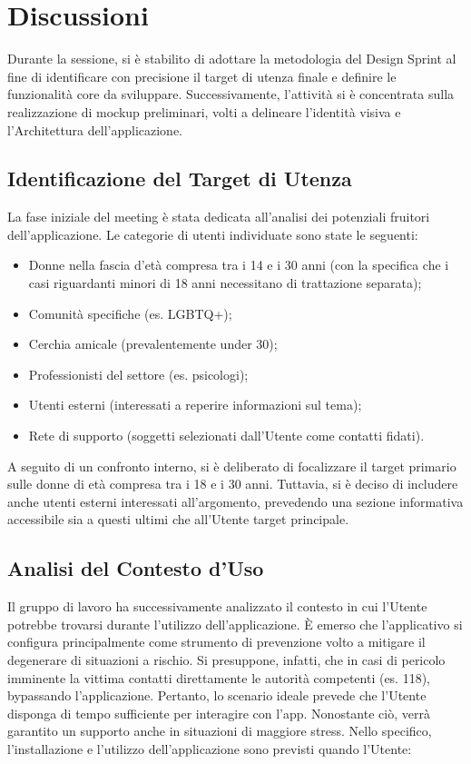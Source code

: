 \documentclass[a4paper,12pt]{article}
\begin{document}
\section{Discussioni}
Durante la sessione, si è stabilito di adottare la metodologia del Design Sprint al fine di identificare con precisione il target di utenza finale e definire le funzionalità core da sviluppare. Successivamente, l'attività si è concentrata sulla realizzazione di mockup preliminari, volti a delineare l'identità visiva e l'Architettura dell'applicazione.

\subsection{Identificazione del Target di Utenza}
La fase iniziale del meeting è stata dedicata all'analisi dei potenziali fruitori dell'applicazione. Le categorie di utenti individuate sono state le seguenti:

\begin{itemize}
    \item Donne nella fascia d'età compresa tra i 14 e i 30 anni (con la specifica che i casi riguardanti minori di 18 anni necessitano di trattazione separata);
    \item Comunità specifiche (es. LGBTQ+);
    \item Cerchia amicale (prevalentemente under 30);
    \item Professionisti del settore (es. psicologi);
    \item Utenti esterni (interessati a reperire informazioni sul tema);
    \item Rete di supporto (soggetti selezionati dall'Utente come contatti fidati).
\end{itemize}

A seguito di un confronto interno, si è deliberato di focalizzare il target primario sulle donne di età compresa tra i 18 e i 30 anni. Tuttavia, si è deciso di includere anche utenti esterni interessati all'argomento, prevedendo una sezione informativa accessibile sia a questi ultimi che all'Utente target principale.

\subsection{Analisi del Contesto d'Uso}
Il gruppo di lavoro ha successivamente analizzato il contesto in cui l'Utente potrebbe trovarsi durante l'utilizzo dell'applicazione.
È emerso che l'applicativo si configura principalmente come strumento di prevenzione volto a mitigare il degenerare di situazioni a rischio. Si presuppone, infatti, che in casi di pericolo imminente la vittima contatti direttamente le autorità competenti (es. 118), bypassando l'applicazione. Pertanto, lo scenario ideale prevede che l'Utente disponga di tempo sufficiente per interagire con l'app. Nonostante ciò, verrà garantito un supporto anche in situazioni di maggiore stress.
Nello specifico, l'installazione e l'utilizzo dell'applicazione sono previsti quando l'Utente:
\end{document}
